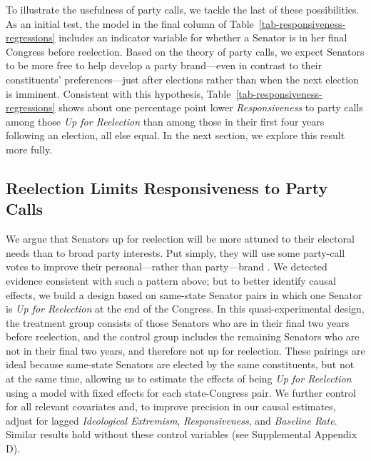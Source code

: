 \documentclass[12pt]{article}
\begin{document}
To illustrate the usefulness of party calls, we tackle the last of these
possibilities.
As an initial test, the model in the final column of
Table~\ref{tab-responsiveness-regressions} includes an indicator variable for
whether a Senator is in her final Congress before reelection.
Based on the theory of party calls, we expect Senators to be more free to help
develop a party brand---even in contrast to their constituents'
preferences---just after elections rather than when the next election is
imminent.
Consistent with this hypothesis, Table~\ref{tab-responsiveness-regressions}
shows about one percentage point lower \textit{Responsiveness} to party calls
among those \textit{Up for Reelection} than among those in their first four
years following an election, all else equal.
In the next section, we explore this result more fully.


\subsection*{Reelection Limits Responsiveness to Party Calls}


We argue that Senators up for reelection will be more attuned to their electoral
needs than to broad party interests.
Put simply, they will use some party-call votes to improve their
personal---rather than party---brand \citep[e.g.,][]{Canes-Wrone:2002,
Carson:2010}.
We detected evidence consistent with such a pattern above; but to better
identify causal effects, we build a design based on same-state Senator pairs in
which one Senator is \textit{Up for Reelection} at the end of the Congress.
In this quasi-experimental design, the treatment group consists of those
Senators who are in their final two years before reelection, and the control
group includes the remaining Senators who are not in their final two years,
and therefore not up for reelection.
These pairings are ideal because same-state Senators are elected by the same
constituents, but not at the same time, allowing us to estimate the effects of
being \textit{Up for Reelection} using a model with fixed effects for each
state-Congress pair.
We further control for all relevant covariates and, to improve precision in our
causal estimates, adjust for lagged \textit{Ideological Extremism},
\textit{Responsiveness}, and \textit{Baseline Rate}.
Similar results hold without these control variables (see Supplemental Appendix
D).
\end{document}
